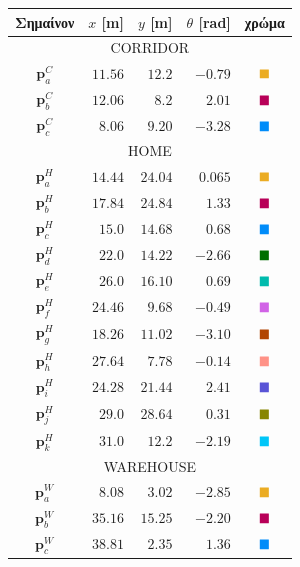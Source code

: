 \begin{table}\centering
  \begin{tabular} {c|rrrc}                                                   \toprule
    Σημαίνον       & $x$ [m]   & $y$  [m]  & $\theta$ [rad]  &  χρώμα     \\ \toprule
    \multicolumn{5}{c}{CORRIDOR}                                          \\ \midrule
    $\bm{p}_a^C$   & $11.56$   & $12.2$    & $-0.79$         & $\squarea$ \\
    $\bm{p}_b^C$   & $12.06$   & $8.2$     & $2.01$          & $\squareb$ \\
    $\bm{p}_c^C$   & $8.06$    & $9.20$    & $-3.28$         & $\squarec$ \\ \midrule
    \multicolumn{5}{c}{HOME}                                              \\ \midrule
    $\bm{p}_a^H$   & $14.44$   & $24.04$   & $0.065$         & $\squarea$ \\
    $\bm{p}_b^H$   & $17.84$   & $24.84$   & $1.33$          & $\squareb$ \\
    $\bm{p}_c^H$   & $15.0$    & $14.68$   & $0.68$          & $\squarec$ \\
    $\bm{p}_d^H$   & $22.0$    & $14.22$   & $-2.66$         & $\squared$ \\
    $\bm{p}_e^H$   & $26.0$    & $16.10$   & $0.69$          & $\squaree$ \\
    $\bm{p}_f^H$   & $24.46$   & $9.68$    & $-0.49$         & $\squaref$ \\
    $\bm{p}_g^H$   & $18.26$   & $11.02$   & $-3.10$         & $\squareg$ \\
    $\bm{p}_h^H$   & $27.64$   & $7.78$    & $-0.14$         & $\squareh$ \\
    $\bm{p}_i^H$   & $24.28$   & $21.44$   & $2.41$          & $\squarei$ \\
    $\bm{p}_j^H$   & $29.0$    & $28.64$   & $0.31$          & $\squarej$ \\
    $\bm{p}_k^H$   & $31.0$    & $12.2$    & $-2.19$         & $\squarek$ \\ \midrule
    \multicolumn{5}{c}{WAREHOUSE}                                         \\ \midrule
    $\bm{p}_a^W$   & $8.08$    & $3.02$    & $-2.85$         & $\squarea$ \\
    $\bm{p}_b^W$   & $35.16$   & $15.25$   & $-2.20$         & $\squareb$ \\
    $\bm{p}_c^W$   & $38.81$   & $2.35$    & $1.36$          & $\squarec$ \\

\end{tabular}
\end{table}
